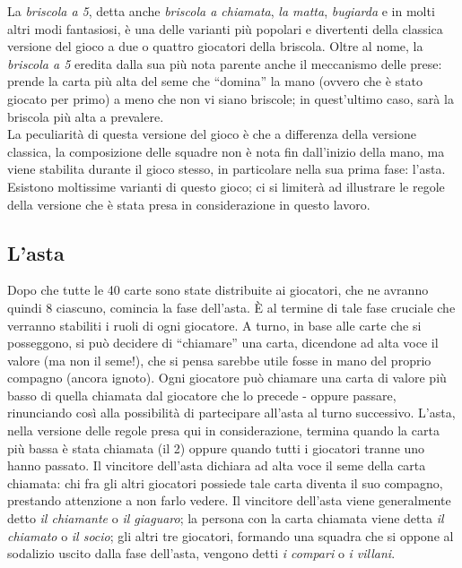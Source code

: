 La \emph{briscola a 5}, detta anche \emph{briscola a chiamata}, \emph{la matta}, \emph{bugiarda} e in molti altri modi fantasiosi, è una delle varianti più popolari e divertenti della classica versione del gioco a due o quattro giocatori della briscola.
Oltre al nome, la \emph{briscola a 5} eredita dalla sua più nota parente anche il meccanismo delle prese: prende la carta più alta del seme che ``domina'' la mano (ovvero che è stato giocato per primo) a meno che non vi siano briscole; in quest'ultimo caso, sarà la briscola più alta a prevalere.\\
La peculiarità di questa versione del gioco è che a differenza della versione classica, la composizione delle squadre non è nota fin dall'inizio della mano, ma viene stabilita durante il gioco stesso, in particolare nella sua prima fase: l'asta.\\
Esistono moltissime varianti di questo gioco; ci si limiterà ad illustrare le regole della versione che è stata presa in considerazione in questo lavoro.


\subsection{L'asta}
Dopo che tutte le 40 carte sono state distribuite ai giocatori, che ne avranno quindi 8 ciascuno, comincia la fase dell'asta.
È al termine di tale fase cruciale che verranno stabiliti i ruoli di ogni giocatore.
A turno, in base alle carte che si posseggono, si può decidere di ``chiamare'' una carta, dicendone ad alta voce il valore (ma non il seme!), che si pensa sarebbe utile fosse in mano del proprio compagno (ancora ignoto).
Ogni giocatore può chiamare una carta di valore più basso di quella chiamata dal giocatore che lo precede - oppure passare, rinunciando così alla possibilità di partecipare all'asta al turno successivo.
L'asta, nella versione delle regole presa qui in considerazione, termina quando la carta più bassa è stata chiamata (il 2) oppure quando tutti i giocatori tranne uno hanno passato.
Il vincitore dell'asta dichiara ad alta voce il seme della carta chiamata: chi fra gli altri giocatori possiede tale carta diventa il suo compagno, prestando attenzione a non farlo vedere.
Il vincitore dell'asta viene generalmente detto \emph{il chiamante} o \emph{il giaguaro};
la persona con la carta chiamata viene detta \emph{il chiamato} o \emph{il socio};
gli altri tre giocatori, formando una squadra che si oppone al sodalizio uscito dalla fase dell'asta, vengono detti \emph{i compari} o \emph{i villani}.

